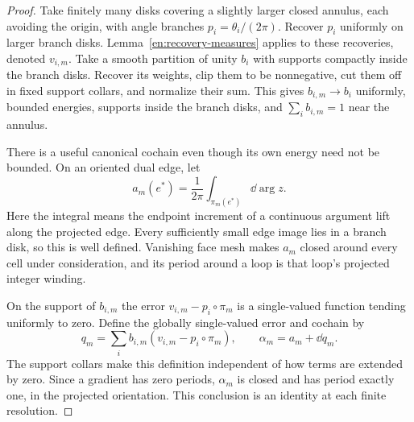 \begin{proof}
Take finitely many disks covering a slightly larger closed annulus,
each avoiding the origin, with angle branches
$p_i=\theta_i/(2\pi)$.  Recover $p_i$ uniformly on larger branch disks.
Lemma~\ref{en:recovery-measures} applies to these recoveries, denoted
$v_{i,m}$.  Take a smooth partition of unity $b_i$ with supports compactly
inside the branch disks.  Recover its weights, clip them to be
nonnegative, cut them off in fixed support collars, and normalize their
sum.  This gives $b_{i,m}\to b_i$ uniformly, bounded energies, supports
inside the branch disks, and $\sum_i b_{i,m}=1$ near the annulus.

There is a useful canonical cochain even though its own energy need
not be bounded.  On an oriented dual edge, let
\[
 a_m(e^*)=\frac1{2\pi}\int_{\pi_m(e^*)}\dd\arg z.
\]
Here the integral means the endpoint increment of a continuous argument
lift along the projected edge.  Every sufficiently small edge image
lies in a branch disk, so this is well defined.  Vanishing face mesh
makes $a_m$ closed around every cell under consideration, and its
period around a loop is that loop's projected integer winding.

On the support of $b_{i,m}$ the error
$v_{i,m}-p_i\circ\pi_m$ is a single-valued function tending uniformly
to zero.  Define the globally single-valued error and cochain by
\begin{equation}\label{en:angular-error}
 q_m=\sum_i b_{i,m}(v_{i,m}-p_i\circ\pi_m),
                 \qquad \alpha_m=a_m+\dd q_m.
\end{equation}
The support collars make this definition independent of how terms are
extended by zero.  Since a gradient has zero periods, $\alpha_m$ is
closed and has period exactly one, in the projected orientation.
This conclusion is an identity at each finite resolution.


\end{proof}
